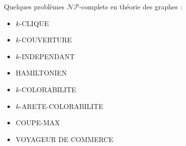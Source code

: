 \begin{myexem}
  Quelques problèmes $\mathcal{NP}$-complets en théorie des graphes :
  \begin{itemize}
    \item $k$-CLIQUE
    \item $k$-COUVERTURE
    \item $k$-INDEPENDANT
    \item HAMILTONIEN
    \item $k$-COLORABILITE
    \item $k$-ARETE-COLORABILITE
    \item COUPE-MAX
    \item VOYAGEUR DE COMMERCE
  \end{itemize}
\end{myexem}